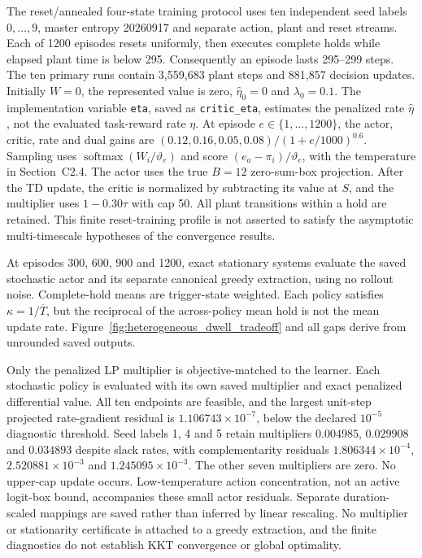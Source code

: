 \documentclass[11pt]{article}
\newcommand{\1}{\mathbf{1}}
\newcommand{\Tbar}{\overline{T}}
\begin{document}
The reset/annealed four-state training protocol uses ten independent seed labels $0,\ldots,9$, master entropy 20260917 and separate action, plant and reset streams. Each of 1200 episodes resets uniformly, then executes complete holds while elapsed plant time is below 295. Consequently an episode lasts 295--299 steps. The ten primary runs contain 3,559,683 plant steps and 881,857 decision updates. Initially $W=0$, the represented value is zero, $\hat\eta_0=0$ and $\lambda_0=0.1$. The implementation variable \texttt{eta}, saved as \texttt{critic\_eta}, estimates the penalized rate $\hat\eta$, not the evaluated task-reward rate $\eta$. At episode $e\in\{1,\ldots,1200\}$, the actor, critic, rate and dual gains are $(0.12,0.16,0.05,0.08)/(1+e/1000)^{0.6}$. Sampling uses $\operatorname{softmax}(W_i/\vartheta_e)$ and score $(e_a-\pi_i)/\vartheta_e$, with the temperature in Section~C2.4. The actor uses the true $B=12$ zero-sum-box projection. After the TD update, the critic is normalized by subtracting its value at $S$, and the multiplier uses $1-0.30\tau$ with cap 50. All plant transitions within a hold are retained. This finite reset-training profile is not asserted to satisfy the asymptotic multi-timescale hypotheses of the convergence results.

At episodes 300, 600, 900 and 1200, exact stationary systems evaluate the saved stochastic actor and its separate canonical greedy extraction, using no rollout noise. Complete-hold means are trigger-state weighted. Each policy satisfies $\kappa=1/\Tbar$, but the reciprocal of the across-policy mean hold is not the mean update rate. Figure~\ref*{fig:heterogeneous_dwell_tradeoff} and all gaps derive from unrounded saved outputs.

Only the penalized LP multiplier is objective-matched to the learner. Each stochastic policy is evaluated with its own saved multiplier and exact penalized differential value. All ten endpoints are feasible, and the largest unit-step projected rate-gradient residual is $1.106743\times10^{-7}$, below the declared $10^{-5}$ diagnostic threshold. Seed labels 1, 4 and 5 retain multipliers $0.004985$, $0.029908$ and $0.034893$ despite slack rates, with complementarity residuals $1.806344\times10^{-4}$, $2.520881\times10^{-3}$ and $1.245095\times10^{-3}$. The other seven multipliers are zero. No upper-cap update occurs. Low-temperature action concentration, not an active logit-box bound, accompanies these small actor residuals. Separate duration-scaled mappings are saved rather than inferred by linear rescaling. No multiplier or stationarity certificate is attached to a greedy extraction, and the finite diagnostics do not establish KKT convergence or global optimality.
\end{document}
